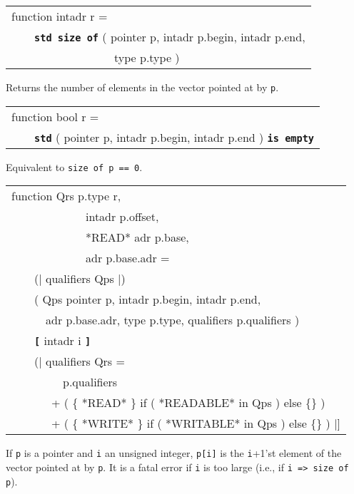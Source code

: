 \documentclass[12pt]{article}
\makeatletter
\newcommand{\TT}[1]{{\tt \bfseries #1}}
\newcommand{\ttstdmkey}[2]{\TT{std #1}\index{#1@{\tt std #1}!#2}}
\newcommand{\ttstdmindex}[2]{\index{#1@{\tt std #1}!#2}}
\newcommand{\ttmindex}[2]{\index{#1@{\tt #1}!#2}}
\newenvironment{indpar}[1][0.3in]%
	{\begin{list}{}%
		     {\setlength{\itemsep}{0in}%
		      \setlength{\topsep}{0in}%
		      \setlength{\parsep}{1ex}%
		      \setlength{\labelwidth}{#1}%
		      \setlength{\leftmargin}{#1}%
		      \addtolength{\leftmargin}{\labelsep}}%
	 \item}%
	{\end{list}}
\makeatother
\begin{document}
\begin{indpar}

{\tt\begin{tabular}{@{}l}
function intadr r = \\
~~~~\ttstdmkey{size of}{pointer}
            ( pointer p, intadr p.begin, intadr p.end, \\
~~~~~~~~~~~~~~~~~~type p.type ) \\
\end{tabular}}

\begin{indpar}
Returns the number of elements
in the vector pointed at by {\tt p}.
\end{indpar}

{\tt\begin{tabular}{@{}l}
function bool r = \\
~~~~\TT{std} ( pointer p, intadr p.begin, intadr p.end )
    \TT{is empty}\ttstdmindex{is empty}{pointer}
\end{tabular}}

\begin{indpar}
Equivalent to {\tt size of p == 0}.
\end{indpar}

{\tt\begin{tabular}{@{}l}
function Qrs p.type r, \\
~~~~~~~~~~~~~intadr p.offset, \\
~~~~~~~~~~~~~*READ* adr p.base, \\
~~~~~~~~~~~~~adr p.base.adr = \\
~~~~(| qualifiers Qps |) \\
~~~~( Qps pointer p, intadr p.begin, intadr p.end, \\
~~~~~~adr p.base.adr, type p.type, qualifiers p.qualifiers ) \\
~~~~\TT{[} intadr i \TT{]}\ttmindex{[]}{of pointer} \\
~~~~(| qualifiers Qrs = \\
~~~~~~~~~p.qualifiers \\
~~~~~~~+ ( \{ *READ* \} if ( *READABLE* in Qps ) else \{\} ) \\
~~~~~~~+ ( \{ *WRITE* \} if ( *WRITABLE* in Qps ) else \{\} )  |] \\
\end{tabular}}

\begin{indpar}
If {\tt p} is a pointer and {\tt i} an unsigned integer,
{\tt p[i]} is the {\tt i}+1'st element of the vector pointed at
by {\tt p}.  It is a fatal error if {\tt i} is too large
(i.e., if {\tt i => size of p}).
\end{indpar}


\end{indpar}
\end{document}
